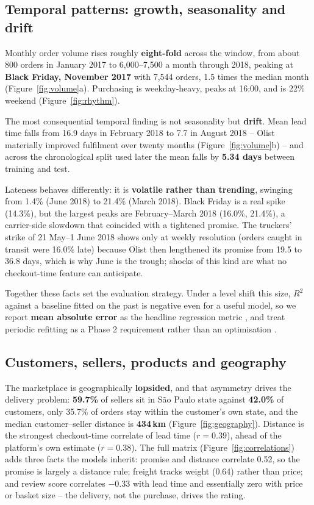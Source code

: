 \subsection{Temporal patterns: growth, seasonality and drift}
\label{sec:temporal}

Monthly order volume rises roughly \textbf{eight-fold} across the window, from
about 800 orders in January 2017 to 6{,}000--7{,}500 a month through 2018,
peaking at \textbf{Black Friday, November 2017} with 7{,}544 orders, 1.5 times
the median month (Figure~\ref{fig:volume}a). Purchasing is weekday-heavy, peaks
at 16:00, and is 22\% weekend (Figure~\ref{fig:rhythm}).

The most consequential temporal finding is not seasonality but \textbf{drift}.
Mean lead time falls from 16.9 days in February 2018 to 7.7 in August 2018 --
Olist materially improved fulfilment over twenty months
(Figure~\ref{fig:volume}b) -- and across the chronological split used later the
mean falls by \textbf{5.34 days} between training and test.

Lateness behaves differently: it is \textbf{volatile rather than trending},
swinging from 1.4\% (June 2018) to 21.4\% (March 2018). Black Friday is a real
spike (14.3\%), but the largest peaks are February--March 2018 (16.0\%, 21.4\%),
a carrier-side slowdown that coincided with a tightened promise. The truckers'
strike of 21 May--1 June 2018 \citep{bloomberg2018strike, tecnoblog2018correios}
shows only at weekly resolution (orders caught in transit were 16.0\% late)
because Olist then lengthened its promise from 19.5 to 36.8 days, which is why
June is the trough; shocks of this kind are what no checkout-time feature can
anticipate.

Together these facts set the evaluation strategy. Under a level shift this size,
$R^2$ against a baseline fitted on the past is negative even for a useful model,
so we report \textbf{mean absolute error} as the headline regression metric
\citep{hyndman2006accuracy}, and treat periodic refitting as a Phase 2
requirement rather than an optimisation \citep{gama2014drift}.

\subsection{Customers, sellers, products and geography}

The marketplace is geographically \textbf{lopsided}, and that asymmetry drives the
delivery problem: \textbf{59.7\%} of sellers sit in S\~{a}o Paulo state against
\textbf{42.0\%} of customers, only 35.7\% of orders stay within the customer's own
state, and the median customer--seller distance is \textbf{434\,km}
(Figure~\ref{fig:geography}). Distance is the strongest checkout-time correlate of
lead time ($r = 0.39$), ahead of the platform's own estimate ($r = 0.38$). The
full matrix (Figure~\ref{fig:correlations}) adds three facts the models inherit:
promise and distance correlate 0.52, so the promise is largely a distance rule;
freight tracks weight (0.64) rather than price; and review score correlates
$-0.33$ with lead time and essentially zero with price or basket size -- the
delivery, not the purchase, drives the rating.

